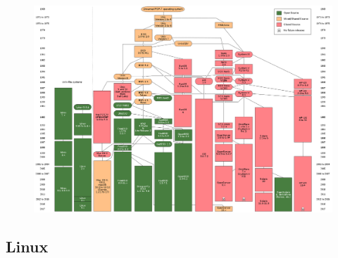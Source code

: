 \documentclass[xcolor=dvipsnames,aspectratio=169]{beamer}
\begin{document}
\begin{frame}
\begin{figure}
 \vspace*{-.5cm} 
\includegraphics[scale=0.24]{unix_hist}
\end{figure}
\end{frame}

\subsection{Linux}
\end{document}
